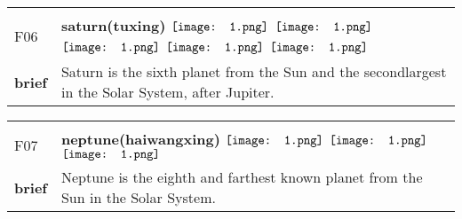 \documentclass[UTF8]{article}
\begin{document}
            \begin{tabularx}{\textwidth}{p{1.5cm}X}
            \arrayrulecolor{myBlue}
        	\hline\\
            \small{F06}&
            \large{\bfseries{saturn(tuxing)}}\hfill
                                                            \phantom{$\vcenter{\hbox{\texttt{[image: 1.png]}}}$}
                                                                \phantom{$\vcenter{\hbox{\texttt{[image: 1.png]}}}$}
                                                                $\vcenter{\hbox{\texttt{[image: 1.png]}}}$
                                                                $\vcenter{\hbox{\texttt{[image: 1.png]}}}$
                                                                $\vcenter{\hbox{\texttt{[image: 1.png]}}}$
                                                                $\vcenter{\hbox{\texttt{[image: 1.png]}}}$
                                                                $\vcenter{\hbox{\texttt{[image: 1.png]}}}$
                                        \\[10pt]
            \large{\bfseries{brief}}&\noindent\parbox[c]{\hsize}{Saturn is the sixth planet from the Sun and the secondlargest in the Solar System, after Jupiter.} \\[5pt]
            \hline\\[-10pt]
        \end{tabularx}
            \begin{tabularx}{\textwidth}{p{1.5cm}X}
            \arrayrulecolor{myBlue}
        	\hline\\
            \small{F07}&
            \large{\bfseries{neptune(haiwangxing)}}\hfill
                                                            $\vcenter{\hbox{\texttt{[image: 1.png]}}}$
                                                                \phantom{$\vcenter{\hbox{\texttt{[image: 1.png]}}}$}
                                                                $\vcenter{\hbox{\texttt{[image: 1.png]}}}$
                                                                \phantom{$\vcenter{\hbox{\texttt{[image: 1.png]}}}$}
                                                                \phantom{$\vcenter{\hbox{\texttt{[image: 1.png]}}}$}
                                                                $\vcenter{\hbox{\texttt{[image: 1.png]}}}$
                                                                \phantom{$\vcenter{\hbox{\texttt{[image: 1.png]}}}$}
                                        \\[10pt]
            \large{\bfseries{brief}}&\noindent\parbox[c]{\hsize}{Neptune is the eighth and farthest known planet from the Sun in the Solar System.} \\[5pt]
            \hline\\[-10pt]
        \end{tabularx}
\end{document}
